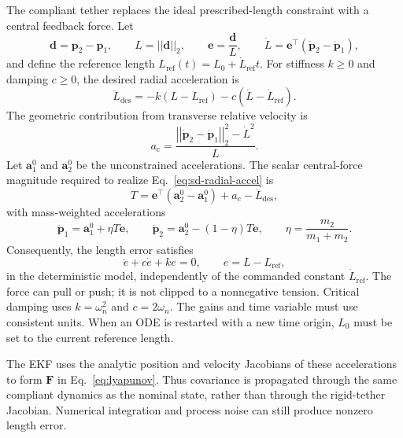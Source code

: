 \documentclass[]{article}
\newcommand{\norm}[1]{\left| \left| #1 \right| \right|_{2}}
\newcommand{\Fm}{\mathbf{F}}
\begin{document}
The compliant tether replaces the ideal prescribed-length constraint with a
central feedback force. Let
\begin{equation}
  \mathbf{d}=\mathbf{p}_2-\mathbf{p}_1,\qquad
  L=\norm{\mathbf{d}},\qquad
  \mathbf{e}=\frac{\mathbf{d}}{L},\qquad
  \dot L=\mathbf{e}^{\top}(\dot{\mathbf{p}}_2-\dot{\mathbf{p}}_1),
\end{equation}
and define the reference length $L_{\mathrm{ref}}(t)=L_0+\dot L_{\mathrm{ref}}t$.
For stiffness $k\geq0$ and damping $c\geq0$, the desired radial acceleration
is
\begin{equation}
  \ddot L_{\mathrm{des}} =
  -k(L-L_{\mathrm{ref}})-c(\dot L-\dot L_{\mathrm{ref}}).
  \label{eq:sd-radial-accel}
\end{equation}
The geometric contribution from transverse relative velocity is
\begin{equation}
  a_{\mathrm{c}} =
  \frac{\norm{\dot{\mathbf{p}}_2-\dot{\mathbf{p}}_1}^{2}-\dot L^{2}}{L}.
\end{equation}
Let $\mathbf{a}_1^0$ and $\mathbf{a}_2^0$ be the unconstrained accelerations.
The scalar central-force magnitude required to realize
Eq.~\eqref{eq:sd-radial-accel} is
\begin{equation}
  T = \mathbf{e}^{\top}(\mathbf{a}_2^0-\mathbf{a}_1^0)
      + a_{\mathrm{c}}-\ddot L_{\mathrm{des}},
\end{equation}
with mass-weighted accelerations
\begin{equation}
  \ddot{\mathbf{p}}_1 = \mathbf{a}_1^0+\eta T\mathbf{e},\qquad
  \ddot{\mathbf{p}}_2 = \mathbf{a}_2^0-(1-\eta)T\mathbf{e},
  \qquad \eta=\frac{m_2}{m_1+m_2}.
\end{equation}
Consequently, the length error satisfies
\begin{equation}
  \ddot e+c\dot e+ke=0,\qquad e=L-L_{\mathrm{ref}},
\end{equation}
in the deterministic model, independently of the commanded constant
$\dot L_{\mathrm{ref}}$. The force can pull or push; it is not clipped to a
nonnegative tension. Critical damping uses $k=\omega_n^2$ and
$c=2\omega_n$. The gains and time variable must use consistent units. When an
ODE is restarted with a new time origin, $L_0$ must be set to the current
reference length.

The EKF uses the analytic position and velocity Jacobians of these
accelerations to form $\Fm$ in Eq.~\eqref{eq:lyapunov}. Thus covariance is
propagated through the same compliant dynamics as the nominal state, rather
than through the rigid-tether Jacobian. Numerical integration and process
noise can still produce nonzero length error.
\end{document}
